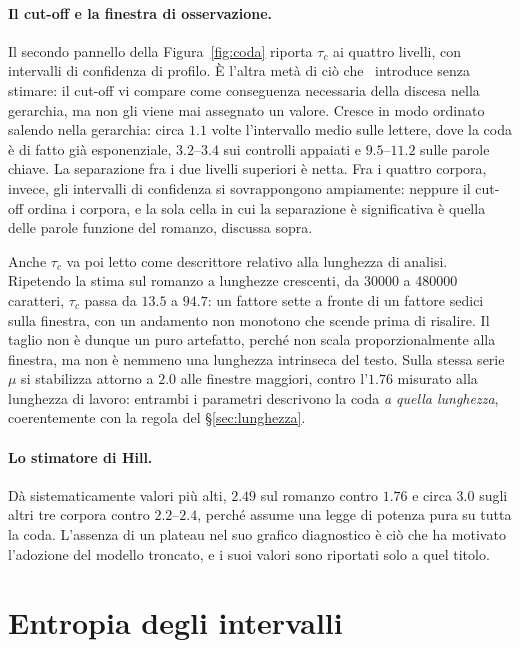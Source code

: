 \paragraph{Il cut-off e la finestra di osservazione.} Il secondo pannello
della Figura~\ref{fig:coda} riporta $\tau_c$ ai quattro livelli, con
intervalli di confidenza di profilo. È l'altra metà di ciò
che~\cite{altmann2012} introduce senza stimare: il cut-off vi compare come
conseguenza necessaria della discesa nella gerarchia, ma non gli viene mai
assegnato un valore. Cresce in modo ordinato salendo nella gerarchia: circa
$1.1$ volte l'intervallo medio sulle lettere, dove la coda è di fatto già
esponenziale, $3.2$--$3.4$ sui controlli appaiati e $9.5$--$11.2$ sulle parole
chiave. La separazione fra i due livelli superiori è netta. Fra i quattro
corpora, invece, gli intervalli di confidenza si sovrappongono ampiamente:
neppure il cut-off ordina i corpora, e la sola cella in cui la separazione è
significativa è quella delle parole funzione del romanzo, discussa sopra.

Anche $\tau_c$ va poi letto come descrittore relativo alla lunghezza di analisi.
Ripetendo la stima sul romanzo a lunghezze crescenti, da \num{30000} a
\num{480000} caratteri, $\tau_c$ passa da $13.5$ a $94.7$: un fattore sette a
fronte di un fattore sedici sulla finestra, con un andamento non monotono che
scende prima di risalire. Il taglio non è dunque un puro artefatto, perché non
scala proporzionalmente alla finestra, ma non è nemmeno una lunghezza intrinseca
del testo. Sulla stessa serie $\mu$ si stabilizza attorno a $2.0$ alle finestre
maggiori, contro l'$1.76$ misurato alla lunghezza di lavoro: entrambi i
parametri descrivono la coda \emph{a quella lunghezza}, coerentemente con la
regola del §\ref{sec:lunghezza}.

\paragraph{Lo stimatore di Hill.} Dà sistematicamente valori più alti, $2.49$ sul
romanzo contro $1.76$ e circa $3.0$ sugli altri tre corpora contro
$2.2$--$2.4$, perché assume una legge di potenza pura su tutta la coda.
L'assenza di un plateau nel suo grafico diagnostico è ciò che ha motivato
l'adozione del modello troncato, e i suoi valori sono riportati solo a quel
titolo.

\section{Entropia degli intervalli}
\label{sec:entropia-intervalli}

